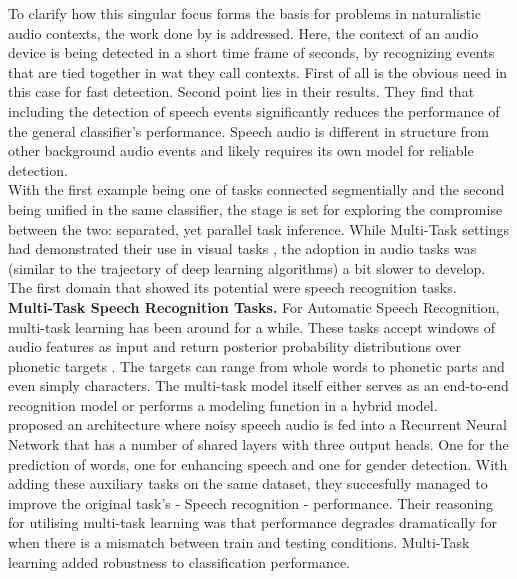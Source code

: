 To clarify how this singular focus forms the basis for problems in naturalistic audio contexts, the work done by \cite{park2020augmenting} is addressed. Here, the context of an audio device is being detected in a short time frame of seconds, by recognizing events that are tied together in wat they call contexts. First of all is the obvious need in this case for fast detection. Second point lies in their results. They find that including the detection of speech events significantly reduces the performance of the general classifier's performance. Speech audio is different in structure from other background audio events and likely requires its own model for reliable detection.\\

With the first example being one of tasks connected segmentially and the second being unified in the same classifier, the stage is set for exploring the compromise between the two: separated, yet parallel task inference. While Multi-Task settings had demonstrated their use in visual tasks \cite{liu2019end}, the adoption in audio tasks was (similar to the trajectory of deep learning algorithms) a bit slower to develop. The first domain that showed its potential were speech recognition tasks.\\


\textbf{Multi-Task Speech Recognition Tasks.} For Automatic Speech Recognition, multi-task learning has been around for a while. These tasks accept windows of audio features as input and return posterior probability distributions over phonetic targets \citep{meyer2019multi}. The targets can range from whole words to phonetic parts and even simply characters. The multi-task model itself either serves as an end-to-end recognition model or performs a modeling function in a hybrid model. \\

\cite{lu2004multitask} proposed an architecture where noisy speech audio is fed into a Recurrent Neural Network that has a number of shared layers with three output heads. One for the prediction of words, one for enhancing speech and one for gender detection. With adding these auxiliary tasks on the same dataset, they succesfully managed to improve the original task's - Speech recognition - performance. Their reasoning for utilising multi-task learning was that performance degrades dramatically for when there is a mismatch between train and testing conditions. Multi-Task learning added robustness to classification performance. \\

